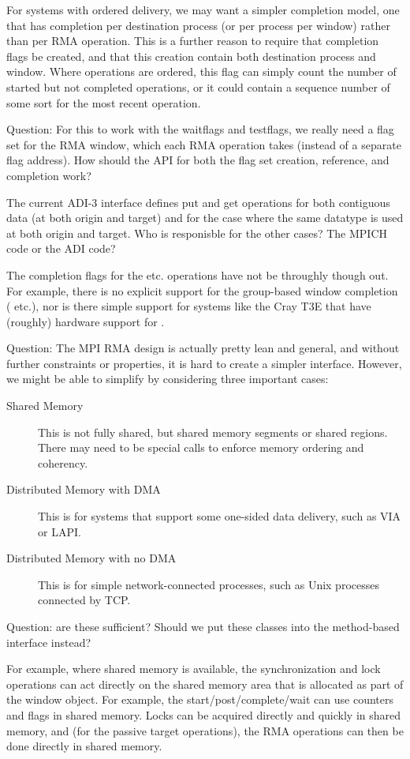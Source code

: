 \documentclass{article}
\begin{document}
For systems with ordered delivery, we may want a simpler completion
model, one that has completion per destination process (or per process
per window) rather than per RMA operation.  This is a further reason
to require that completion flags be created, and that this creation
contain both destination process and window.  Where operations are
ordered, this flag can simply count the number of started but not
completed operations, or it could contain a sequence number of some
sort for the most recent operation.  

Question:  For this to work with the waitflags and testflags, we
really need a flag set for the RMA window, which each RMA operation
takes (instead of a separate flag address).  How should the API for
both the flag set creation, reference, and completion work?  

The current ADI-3 interface defines put and get operations for both
contiguous data (at both origin and target) and for the case where the
same datatype is used at both origin and target.  Who is responisble
for the other cases?  The MPICH code or the ADI code?

The completion flags for the  etc. operations
have not be throughly though out.  For example, there is no explicit
support for the group-based window completion (
etc.), nor is there simple support for systems like the Cray T3E that
have (roughly) hardware support for .

Question: The MPI RMA design is actually pretty lean and general, and
without further constraints or properties, it is hard to create a
simpler interface.  However, we might be able to simplify by
considering three important cases:
\begin{description}
\item[Shared Memory]This is not fully shared, but shared memory
segments or shared  regions. There may need to be special
calls to enforce memory ordering and coherency.
\item[Distributed Memory with DMA]This is for systems that support
some one-sided data delivery, such as VIA or LAPI.
\item[Distributed Memory with no DMA]This is for simple
network-connected processes, such as Unix processes connected by TCP.
\end{description}
Question: are these sufficient?  Should we put these classes into the
method-based interface instead?

For example, where shared memory is available, the synchronization and
lock operations can act directly on the shared memory area that is
allocated as part of the window object.  For example, the
start/post/complete/wait can use counters and flags in shared memory.
Locks can be acquired directly and quickly in shared memory, and (for
the passive target operations), the RMA operations can then be done
directly in shared memory.
\end{document}
